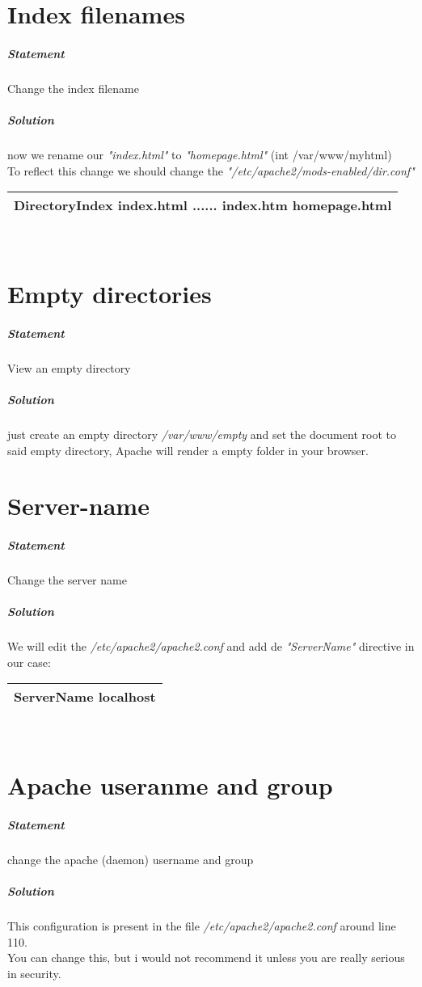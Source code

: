 \documentclass[a4paper,10pt]{article}
\begin{document}
\section{Index filenames}
\subparagraph{Statement}
Change the index filename
\subparagraph{Solution}
now we rename our {\it "index.html"} to {\it "homepage.html"} (int /var/www/myhtml)\\
To reflect this change we should change the {\it "/etc/apache2/mods-enabled/dir.conf"}
\vspace{0.5cm}\\\begin{tabular}{|l|}\hline
DirectoryIndex index.html ...... index.htm homepage.html
\\\hline\end{tabular}\vspace{0.5cm}\\


\section{Empty directories}
\subparagraph{Statement}
View an empty directory
\subparagraph{Solution}
just create an empty directory {\it /var/www/empty} and set the document root to said empty directory, Apache will render a empty folder in your browser.
\pagebreak

\section{Server-name}
\subparagraph{Statement}
Change the server name
\subparagraph{Solution}
We will edit the {\it /etc/apache2/apache2.conf} and add de {\it "ServerName"} directive in our case:
\vspace{0.5cm}\\\begin{tabular}{|l|}\hline
ServerName localhost
\\\hline\end{tabular}\vspace{0.5cm}\\

\section{Apache useranme and group}
\subparagraph{Statement}
change the apache (daemon) username and group
\subparagraph{Solution}
This configuration is present in the file {\it /etc/apache2/apache2.conf} around line 110.\\
You can change this, but i would not recommend it unless you are really serious in security.
\end{document}
